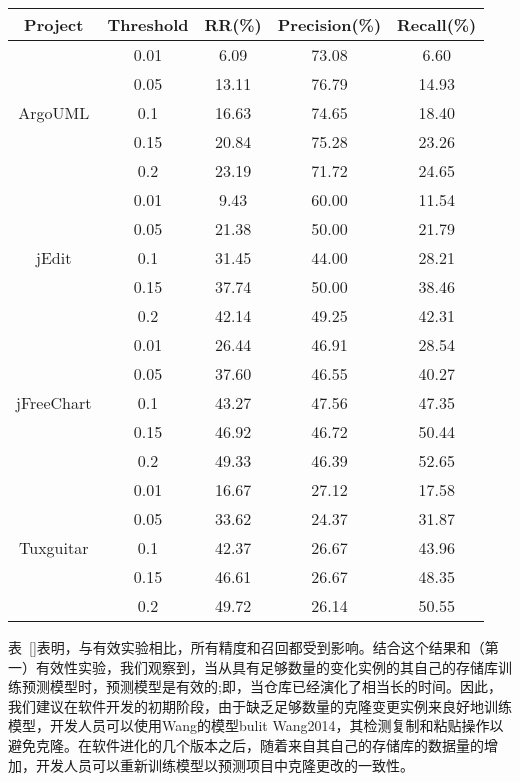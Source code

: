 {\begin{table}[htbp]
\vspace{0.5em}\centering\wuhao
\begin{tabular}{ccccc}
\toprule[1.5pt]
{\textbf{Project}}&{\textbf{Threshold}}&{\textbf{RR(\%)}}&{\textbf{Precision(\%)}}&{\textbf{Recall(\%)}}\\

\midrule[1pt]
\multirow{5}{*}{ArgoUML}
&0.01&	6.09&	73.08&	6.60\\
&0.05&	13.11&	76.79&	14.93\\
&0.1&	16.63&	74.65&	18.40\\
&0.15&	20.84&	75.28&	23.26\\
&0.2&	23.19&	71.72&	24.65\\
\hline
\multirow{5}{*}{jEdit}
&0.01&	9.43&	60.00&	11.54\\
&0.05&	21.38&	50.00&	21.79\\
&0.1&	31.45&	44.00&	28.21\\
&0.15&	37.74&	50.00&	38.46\\
&0.2&	42.14&	49.25&	42.31\\
\hline
\multirow{5}{*}{jFreeChart}
&0.01&	26.44&	46.91&	28.54\\
&0.05&	37.60&	46.55&	40.27\\
&0.1&	43.27&	47.56&	47.35\\
&0.15&	46.92&	46.72&	50.44\\
&0.2&	49.33&	46.39&	52.65\\
\hline
\multirow{5}{*}{Tuxguitar}
&0.01&	16.67&	27.12&	17.58\\
&0.05&	33.62&	24.37&	31.87\\
&0.1&	42.37&	26.67&	43.96\\
&0.15&	46.61&	26.67&	48.35\\
&0.2&	49.72&	26.14&	50.55\\
\hline
\bottomrule[1.5pt]
\end{tabular}
\end{table}

表~\ref{}表明，与有效实验相比，所有精度和召回都受到影响。结合这个结果和（第一）有效性实验，我们观察到，当从具有足够数量的变化实例的其自己的存储库训练预测模型时，预测模型是有效的;即，当仓库已经演化了相当长的时间。因此，我们建议在软件开发的初期阶段，由于缺乏足够数量的克隆变更实例来良好地训练模型，开发人员可以使用Wang的模型bulit  \cite{} { Wang2014}，其检测复制和粘贴操作以避免克隆。在软件进化的几个版本之后，随着来自其自己的存储库的数据量的增加，开发人员可以重新训练模型以预测项目中克隆更改的一致性。

}
